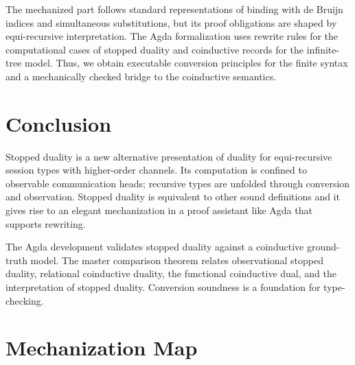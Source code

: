 \documentclass[submission,copyright,creativecommons]{eptcs}
\begin{document}
The mechanized part follows standard representations of binding with de Bruijn
indices and simultaneous substitutions, but its proof obligations are shaped
by equi-recursive interpretation.  The Agda formalization \cite{agda} uses
rewrite rules \cite{cockx:LIPIcs.TYPES.2019.2,10.1145/3434341} for the computational cases of stopped duality and coinductive
records for the infinite-tree model.  Thus, we obtain executable conversion
principles for the finite syntax and a mechanically checked bridge to the
coinductive semantics.

\section{Conclusion}
\label{sec:conclusion}

Stopped duality is a new alternative presentation of duality for equi-recursive
session types with higher-order channels.  Its computation is confined
to observable communication heads; recursive types are unfolded through
conversion and observation.  Stopped duality is equivalent to other sound
definitions and it gives rise to an elegant mechanization in a proof assistant
like Agda that supports rewriting.

The Agda development validates stopped duality against a coinductive
ground-truth model.  The master comparison theorem relates observational
stopped duality, relational coinductive duality, the functional coinductive
dual, and the interpretation of stopped duality.  Conversion soundness is a
foundation for type-checking.




\appendix

\section{Mechanization Map}
\end{document}
